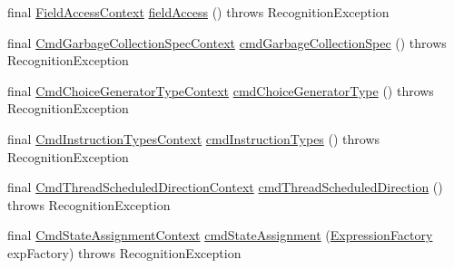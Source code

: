 \begin{DoxyCompactItemize}
\item 
final \hyperlink{classgov_1_1nasa_1_1jpf_1_1inspector_1_1server_1_1expression_1_1parser_1_1_expression_grammar_parser_1_1_field_access_context}{Field\+Access\+Context} \hyperlink{classgov_1_1nasa_1_1jpf_1_1inspector_1_1server_1_1expression_1_1parser_1_1_expression_grammar_parser_ab65b047e852d9f4863e316728b4e791a}{field\+Access} ()  throws Recognition\+Exception 
\item 
final \hyperlink{classgov_1_1nasa_1_1jpf_1_1inspector_1_1server_1_1expression_1_1parser_1_1_expression_grammar_pa9b16c5c3aaa9986dba28b01bf7446bf9}{Cmd\+Garbage\+Collection\+Spec\+Context} \hyperlink{classgov_1_1nasa_1_1jpf_1_1inspector_1_1server_1_1expression_1_1parser_1_1_expression_grammar_parser_a2218573ae0b280b9f81bd8a58b34932c}{cmd\+Garbage\+Collection\+Spec} ()  throws Recognition\+Exception 
\item 
final \hyperlink{classgov_1_1nasa_1_1jpf_1_1inspector_1_1server_1_1expression_1_1parser_1_1_expression_grammar_pa25195f4046c6a14884faf2c870f5b76d}{Cmd\+Choice\+Generator\+Type\+Context} \hyperlink{classgov_1_1nasa_1_1jpf_1_1inspector_1_1server_1_1expression_1_1parser_1_1_expression_grammar_parser_aa13af7ba7969feaa3eafc1383a1f42a1}{cmd\+Choice\+Generator\+Type} ()  throws Recognition\+Exception 
\item 
final \hyperlink{classgov_1_1nasa_1_1jpf_1_1inspector_1_1server_1_1expression_1_1parser_1_1_expression_grammar_pab3186941420d0c466c6d856eeff6b665}{Cmd\+Instruction\+Types\+Context} \hyperlink{classgov_1_1nasa_1_1jpf_1_1inspector_1_1server_1_1expression_1_1parser_1_1_expression_grammar_parser_a12e3659aace4eacebed317642d151170}{cmd\+Instruction\+Types} ()  throws Recognition\+Exception 
\item 
final \hyperlink{classgov_1_1nasa_1_1jpf_1_1inspector_1_1server_1_1expression_1_1parser_1_1_expression_grammar_pa3ae49d5d83c380526042a5aff91ee0a2}{Cmd\+Thread\+Scheduled\+Direction\+Context} \hyperlink{classgov_1_1nasa_1_1jpf_1_1inspector_1_1server_1_1expression_1_1parser_1_1_expression_grammar_parser_aa1e14518e300b02c71f006c270cb4c41}{cmd\+Thread\+Scheduled\+Direction} ()  throws Recognition\+Exception 
\item 
final \hyperlink{classgov_1_1nasa_1_1jpf_1_1inspector_1_1server_1_1expression_1_1parser_1_1_expression_grammar_padaf6f2235297f2d833b81c76746458f3}{Cmd\+State\+Assignment\+Context} \hyperlink{classgov_1_1nasa_1_1jpf_1_1inspector_1_1server_1_1expression_1_1parser_1_1_expression_grammar_parser_a1958fde2beccd39e36dd73e36ef1ffd6}{cmd\+State\+Assignment} (\hyperlink{classgov_1_1nasa_1_1jpf_1_1inspector_1_1server_1_1expression_1_1_expression_factory}{Expression\+Factory} exp\+Factory)  throws Recognition\+Exception 

\end{DoxyCompactItemize}

